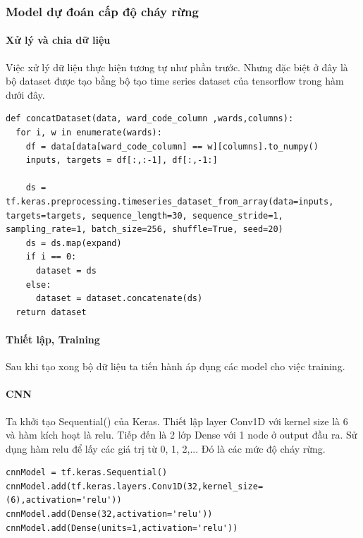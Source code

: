 \documentclass{article}
\begin{document}
\subsubsection{Model dự đoán cấp độ cháy rừng}

\paragraph{Xử lý và chia dữ liệu}
Việc xử lý dữ liệu thực hiện tương tự như phần trước. Nhưng đặc biệt ở đây là bộ dataset được tạo bằng bộ tạo time series dataset của tensorflow trong hàm dưới đây.

\begin{verbatim}
def concatDataset(data, ward_code_column ,wards,columns):
  for i, w in enumerate(wards):
    df = data[data[ward_code_column] == w][columns].to_numpy()
    inputs, targets = df[:,:-1], df[:,-1:]
    
    ds = tf.keras.preprocessing.timeseries_dataset_from_array(data=inputs, targets=targets, sequence_length=30, sequence_stride=1, sampling_rate=1, batch_size=256, shuffle=True, seed=20)
    ds = ds.map(expand)
    if i == 0:
      dataset = ds
    else:
      dataset = dataset.concatenate(ds)
  return dataset
\end{verbatim}

\paragraph{Thiết lập, Training}
Sau khi tạo xong bộ dữ liệu ta tiến hành áp dụng các model cho việc training.

\paragraph{CNN}
Ta khởi tạo Sequential() của Keras. Thiết lập layer Conv1D với kernel size là 6 và hàm kích hoạt là relu. Tiếp đến là 2 lớp Dense với 1 node ở output đầu ra. Sử dụng hàm relu để lấy các giá trị từ 0, 1, 2,... Đó là các mức độ cháy rừng.

\begin{verbatim}
cnnModel = tf.keras.Sequential()
cnnModel.add(tf.keras.layers.Conv1D(32,kernel_size=(6),activation='relu'))
cnnModel.add(Dense(32,activation='relu'))
cnnModel.add(Dense(units=1,activation='relu'))
\end{verbatim}
\end{document}
